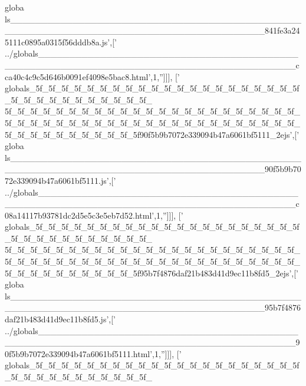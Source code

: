 \begin{DoxyCode}
{      globa
      ls\_\_\_\_\_\_\_\_\_\_\_\_\_\_\_\_\_\_\_\_\_\_\_\_\_\_\_\_\_\_\_\_\_\_\_\_\_\_\_\_\_\_\_\_\_\_\_\_\_\_\_\_\_\_\_\_\_\_\_\_\_\_\_\_\_\_\_\_\_\_\_\_\_\_\_\_\_\_\_\_\_\_\_\_\_\_\_\_\_841fe3a245111c0895a0315f56dddb8a.js'},[\textcolor{stringliteral}{'
      ../globals\_\_\_\_\_\_\_\_\_\_\_\_\_\_\_\_\_\_\_\_\_\_\_\_\_\_\_\_\_\_\_\_\_\_\_\_\_\_\_\_\_\_\_\_\_\_\_\_\_\_\_\_\_\_\_\_\_\_\_\_\_\_\_\_\_\_\_\_\_\_\_\_\_\_\_\_\_\_\_\_\_\_\_\_\_\_\_\_\_cca40c4c9c5d646b0091ef4098e5bac8.html'},1,\textcolor{stringliteral}{''}]]],
  [\textcolor{stringliteral}{'
      globals\_5f\_5f\_5f\_5f\_5f\_5f\_5f\_5f\_5f\_5f\_5f\_5f\_5f\_5f\_5f\_5f\_5f\_5f\_5f\_5f\_5f\_5f\_5f\_5f\_5f\_5f\_5f\_5f\_5f\_5f\_5f\_5f\_
      5f\_5f\_5f\_5f\_5f\_5f\_5f\_5f\_5f\_5f\_5f\_5f\_5f\_5f\_5f\_5f\_5f\_5f\_5f\_5f\_5f\_5f\_5f\_5f\_5f\_5f\_5f\_5f\_5f\_5f\_5f\_5f\_5f\_5f\_5f\_5f\_5f\_5f\_5f\_5f\_5f\_5f\_5f\_5f\_5f\_5f\_5f\_5f\_5f\_5f\_5f\_5f\_5f\_5f\_5f\_5f\_5f90f5b9b7072e339094b47a6061bf5111\_2ejs'},[\textcolor{stringliteral}{'
      globa
      ls\_\_\_\_\_\_\_\_\_\_\_\_\_\_\_\_\_\_\_\_\_\_\_\_\_\_\_\_\_\_\_\_\_\_\_\_\_\_\_\_\_\_\_\_\_\_\_\_\_\_\_\_\_\_\_\_\_\_\_\_\_\_\_\_\_\_\_\_\_\_\_\_\_\_\_\_\_\_\_\_\_\_\_\_\_\_\_\_\_90f5b9b7072e339094b47a6061bf5111.js'},[\textcolor{stringliteral}{'
      ../globals\_\_\_\_\_\_\_\_\_\_\_\_\_\_\_\_\_\_\_\_\_\_\_\_\_\_\_\_\_\_\_\_\_\_\_\_\_\_\_\_\_\_\_\_\_\_\_\_\_\_\_\_\_\_\_\_\_\_\_\_\_\_\_\_\_\_\_\_\_\_\_\_\_\_\_\_\_\_\_\_\_\_\_\_\_\_\_\_\_c08a14117b93781dc2d5e5c3e5eb7d52.html'},1,\textcolor{stringliteral}{''}]]],
  [\textcolor{stringliteral}{'
      globals\_5f\_5f\_5f\_5f\_5f\_5f\_5f\_5f\_5f\_5f\_5f\_5f\_5f\_5f\_5f\_5f\_5f\_5f\_5f\_5f\_5f\_5f\_5f\_5f\_5f\_5f\_5f\_5f\_5f\_5f\_5f\_5f\_
      5f\_5f\_5f\_5f\_5f\_5f\_5f\_5f\_5f\_5f\_5f\_5f\_5f\_5f\_5f\_5f\_5f\_5f\_5f\_5f\_5f\_5f\_5f\_5f\_5f\_5f\_5f\_5f\_5f\_5f\_5f\_5f\_5f\_5f\_5f\_5f\_5f\_5f\_5f\_5f\_5f\_5f\_5f\_5f\_5f\_5f\_5f\_5f\_5f\_5f\_5f\_5f\_5f\_5f\_5f\_5f\_5f95b7f4876daf21b483d41d9ec11b8fd5\_2ejs'},[\textcolor{stringliteral}{'
      globa
      ls\_\_\_\_\_\_\_\_\_\_\_\_\_\_\_\_\_\_\_\_\_\_\_\_\_\_\_\_\_\_\_\_\_\_\_\_\_\_\_\_\_\_\_\_\_\_\_\_\_\_\_\_\_\_\_\_\_\_\_\_\_\_\_\_\_\_\_\_\_\_\_\_\_\_\_\_\_\_\_\_\_\_\_\_\_\_\_\_\_95b7f4876daf21b483d41d9ec11b8fd5.js'},[\textcolor{stringliteral}{'
      ../globals\_\_\_\_\_\_\_\_\_\_\_\_\_\_\_\_\_\_\_\_\_\_\_\_\_\_\_\_\_\_\_\_\_\_\_\_\_\_\_\_\_\_\_\_\_\_\_\_\_\_\_\_\_\_\_\_\_\_\_\_\_\_\_\_\_\_\_\_\_\_\_\_\_\_\_\_\_\_\_\_\_\_\_\_\_\_\_\_\_90f5b9b7072e339094b47a6061bf5111.html'},1,\textcolor{stringliteral}{''}]]],
  [\textcolor{stringliteral}{'
      globals\_5f\_5f\_5f\_5f\_5f\_5f\_5f\_5f\_5f\_5f\_5f\_5f\_5f\_5f\_5f\_5f\_5f\_5f\_5f\_5f\_5f\_5f\_5f\_5f\_5f\_5f\_5f\_5f\_5f\_5f\_5f\_5f\_
}
\end{DoxyCode}
